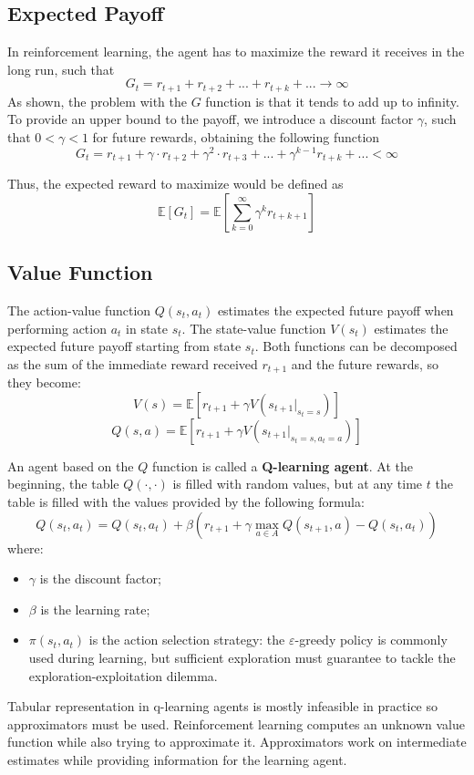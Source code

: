 \documentclass{article}
\begin{document}
\subsection{Expected Payoff}
In reinforcement learning, the agent has to maximize the reward it receives in the long run, such that
\[G_t = r_{t+1} + r_{t+2} + ... + r_{t+k} + ... \to \infty\]
As shown, the problem with the \(G\) function is that it tends to add up to infinity. To provide an upper bound to the payoff, we introduce a discount factor \(\gamma\), such that \(0 < \gamma < 1\) for future rewards, obtaining the following function
\[G_t = r_{t+1} + \gamma \cdot r_{t+2} + \gamma^2 \cdot r_{t+3} + ... + \gamma^{k-1} r_{t+k} + ... < \infty \]

Thus, the expected reward to maximize would be defined as
\[\mathbb{E}[G_t] = \mathbb{E}\left[\sum_{k=0}^{\infty}\gamma^k r_{t+k+1}\right]\]

\subsection{Value Function}
The action-value function \(Q(s_t, a_t)\) estimates the expected future payoff when performing action \(a_t\) in state \(s_t\). The state-value function \(V(s_t)\) estimates the expected future payoff starting from state \(s_t\). Both functions can be decomposed as the sum of the immediate reward received \(r_{t+1}\) and the future rewards, so they become:
\[V(s) = \mathbb{E}[r_{t+1}+\gamma V(s_{t+1}|_{s_t=s})]\]
\[Q(s,a) = \mathbb{E}[r_{t+1}+\gamma  V(s_{t+1}|_{s_t =s, a_t = a})]\]

An agent based on the \(Q\) function is called a \textbf{Q-learning agent}. At the beginning, the table \(Q(\cdot, \cdot)\) is filled with random values, but at any time \(t\) the table is filled with the values provided by the following formula:
\[Q(s_t, a_t) = Q(s_t, a_t) + \beta(r_{t+1} + \gamma  \max_{a\in A}Q(s_{t+1}, a) - Q(s_t, a_t)) \]
where:
\begin{itemize}
    \item \(\gamma\) is the discount factor;
    \item \(\beta\) is the learning rate;
    \item \(\pi(s_t, a_t)\) is the action selection strategy: the \(\varepsilon\)-greedy policy is commonly used during learning, but sufficient exploration must guarantee to tackle the exploration-exploitation dilemma.
\end{itemize}

Tabular representation in q-learning agents is mostly infeasible in practice so approximators must be used. Reinforcement learning computes an unknown value function while also trying to approximate it. Approximators work on intermediate estimates while providing information for the learning agent. 
\end{document}
